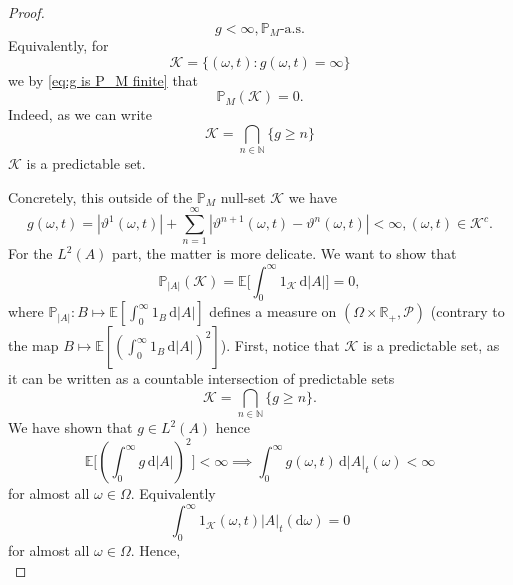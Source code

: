 \documentclass[11pt,a4paper,twoside,openany]{report}
\numberwithin{equation}{section}
\newcommand{\diff}{\mathrm{d}}
\theoremstyle{plain} %
\theoremstyle{definition} %
\theoremstyle{remark} %
\begin{document}
\begin{proof}
\begin{equation}
        g<\infty,\mathbb{P}_M\text{-a.s.}
    \end{equation}
    Equivalently, for
     \begin{equation*}
        \mathcal{K}=\{(\omega,t):g(\omega,t)=\infty\}
    \end{equation*}
    we by \eqref{eq:g is P_M finite} that
    \begin{equation*}
        \mathbb{P}_M(\mathcal{K})=0.
    \end{equation*}
    Indeed, as we can write
    \begin{equation*}
         \mathcal{K}=\bigcap_{n\in\mathbb{N}}\{g\geq n\}
     \end{equation*}
     \(\mathcal{K}\) is a predictable set.

    
    Concretely, this outside of the \(\mathbb{P}_M\) null-set \(\mathcal{K}\) we have 
    \begin{equation*}
        g(\omega,t)=|\vartheta^1(\omega,t)|+\sum_{n=1}^\infty|\vartheta^{n+1}(\omega,t)-\vartheta^n(\omega,t)|<\infty,(\omega,t)\in \mathcal{K}^{c}.
    \end{equation*}
    For the \(L^2(A)\) part, the matter is more delicate. 
    We want to show that 
     \begin{equation*}
         \mathbb{P}_{|A|}(\mathcal{K}) = \mathbb{E}\bigg[\int_0^{\infty}1_\mathcal{K}\,\diff |A|\bigg]=0,
     \end{equation*}
     where \(\mathbb{P}_{|A|}:B\mapsto \mathbb{E}[\int_0^{\infty}1_B\,\diff |A|]\) defines a measure on \((\Omega\times\mathbb{R}_+,\mathcal{P})\) (contrary to the map \(B\mapsto \mathbb{E}[(\int_0^{\infty}1_B\,\diff |A|)^2]\)). First, notice that \(\mathcal{K}\) is a predictable set, as it can be written as a countable intersection of predictable sets
     \begin{equation*}
         \mathcal{K}=\bigcap_{n\in\mathbb{N}}\{g\geq n\}.
     \end{equation*}
We have shown that \(g\in L^2(A)\) hence
     \begin{equation*}
          \mathbb{E}\bigg[(\int_{0}^{\infty}g\,\diff |A|)^2\bigg]<\infty\implies \int_{0}^{\infty}g(\omega,t)\,\diff |A|_t(\omega)<\infty
     \end{equation*}
     for almost all \(\omega\in \Omega\).
  Equivalently
  \begin{equation*}
      \int_0^\infty 1_{\mathcal{K}}(\omega,t) |A|_t(\diff\omega)=0
  \end{equation*}
  for almost all \(\omega\in\Omega\). Hence, 
  \begin{equation*}

\end{equation*}
\end{proof}
\end{document}
